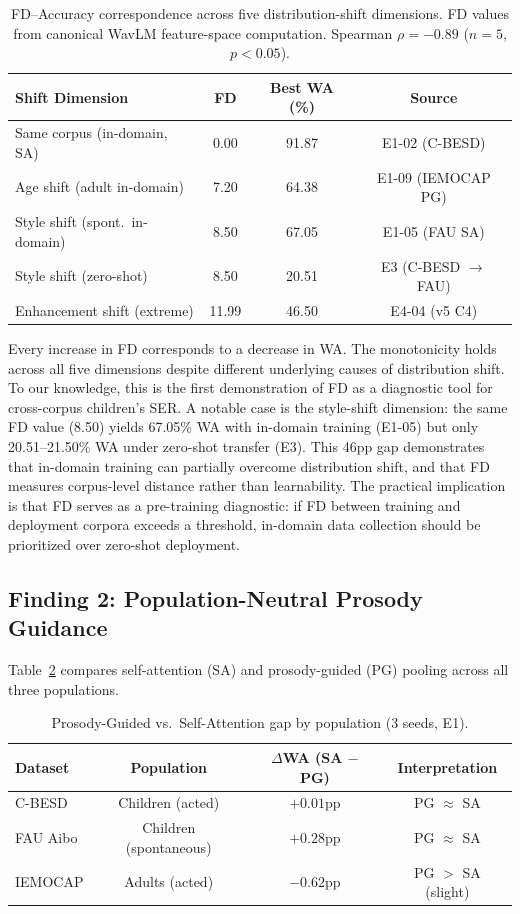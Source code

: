 \documentclass[11pt,a4paper]{article}
\begin{document}
\begin{table}[h]
\centering
\caption{FD--Accuracy correspondence across five distribution-shift dimensions. FD values from canonical WavLM feature-space computation. Spearman $\rho = -0.89$ ($n=5$, $p<0.05$).}
\label{tab:fd_wa}
\begin{tabular}{lccc}
\toprule
\textbf{Shift Dimension} & \textbf{FD} & \textbf{Best WA (\%)} & \textbf{Source} \\
\midrule
Same corpus (in-domain, SA)     & 0.00  & 91.87 & E1-02 (C-BESD) \\
Age shift (adult in-domain)     & 7.20  & 64.38 & E1-09 (IEMOCAP PG) \\
Style shift (spont.\ in-domain) & 8.50  & 67.05 & E1-05 (FAU SA) \\
Style shift (zero-shot)         & 8.50  & 20.51 & E3 (C-BESD $\rightarrow$ FAU) \\
Enhancement shift (extreme)     & 11.99 & 46.50 & E4-04 (v5 C4) \\
\bottomrule
\end{tabular}
\end{table}

Every increase in FD corresponds to a decrease in WA. The monotonicity holds
across all five dimensions despite different underlying causes of distribution
shift. To our knowledge, this is the first demonstration of FD as a diagnostic
tool for cross-corpus children's SER. A notable case is the style-shift dimension: the same FD value (8.50)
yields 67.05\% WA with in-domain training (E1-05) but only 20.51--21.50\% WA
under zero-shot transfer (E3). This 46pp gap demonstrates that in-domain
training can partially overcome distribution shift, and that FD measures
corpus-level distance rather than learnability. The practical implication is
that FD serves as a pre-training diagnostic: if FD between training and
deployment corpora exceeds a threshold, in-domain data collection should be
prioritized over zero-shot deployment.

\subsection{Finding 2: Population-Neutral Prosody Guidance}

Table~\ref{tab:prosody_gap} compares self-attention (SA) and prosody-guided
(PG) pooling across all three populations.

\begin{table}[h]
\centering
\caption{Prosody-Guided vs.\ Self-Attention gap by population (3 seeds, E1).}
\label{tab:prosody_gap}
\begin{tabular}{lccc}
\toprule
\textbf{Dataset} & \textbf{Population} & \textbf{$\Delta$WA (SA $-$ PG)} & \textbf{Interpretation} \\
\midrule
C-BESD   & Children (acted)      & $+0.01$pp & PG $\approx$ SA \\
FAU Aibo & Children (spontaneous) & $+0.28$pp & PG $\approx$ SA \\
IEMOCAP  & Adults (acted)        & $-0.62$pp & PG $>$ SA (slight) \\
\bottomrule
\end{tabular}
\end{table}
\end{document}
